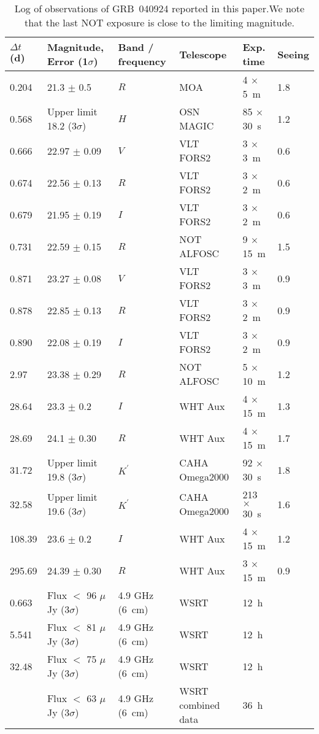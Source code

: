 \begin{table}%
\par
\caption{Log of observations of GRB~040924 reported in this paper.\label{obstable} We note that the last NOT exposure is close to the limiting magnitude.}
\begin{tabular}{llllll}
\hline\hline
 $\Delta t$ (d) & Magnitude, Error (1$\sigma$) & Band / frequency & Telescope & Exp. time & Seeing\\
\hline
0.204 & 21.3 $\pm$ 0.5 & $R$ & MOA & 4 $\times$ 5~m & 1.8\\
0.568 & Upper limit 18.2 (3$\sigma$) & $H$ & OSN MAGIC & 85 $\times$ 30~s &1.2\\
0.666 &  22.97 $\pm$ 0.09 & $V$ & VLT FORS2  & 3 $\times$ 3~m& 0.6\\
0.674 & 22.56 $\pm$ 0.13 & $R$ & VLT FORS2  & 3 $\times$ 2~m &0.6\\
0.679 & 21.95 $\pm$ 0.19 & $I$ & VLT FORS2  & 3 $\times$ 2~m &0.6\\
0.731 & 22.59 $\pm$ 0.15 & $R$ & NOT ALFOSC & 9 $\times$ 15~m&1.5\\
0.871 & 23.27 $\pm$ 0.08 & $V$ & VLT FORS2 & 3 $\times$ 3~m& 0.9\\
0.878 & 22.85 $\pm$ 0.13 & $R$ & VLT FORS2& 3 $\times$ 2~m   &0.9\\
0.890 & 22.08 $\pm$ 0.19& $I$ & VLT FORS2& 3 $\times$ 2~m   & 0.9\\
2.97 & 23.38 $\pm$ 0.29  & $R$ & NOT ALFOSC & 5 $\times$ 10~m &1.2\\
28.64 & 23.3  $\pm$  0.2& $I$ & WHT Aux  & 4 $\times$ 15~m & 1.3\\
28.69 & 24.1 $\pm$ 0.30 & $R$ & WHT Aux  & 4 $\times$ 15~m & 1.7 \\
31.72 & Upper limit 19.8 (3$\sigma$) & $K^\prime$ & CAHA Omega2000  &  92 $\times$ 30~s&1.8\\
32.58 & Upper limit 19.6 (3$\sigma$) & $K^\prime$ & CAHA Omega2000 & 213 $\times$ 30~s& 1.6 \\
108.39& 23.6 $\pm$ 0.2  & $I$ & WHT Aux  & 4 $\times$ 15~m & 1.2\\
295.69 & 24.39 $\pm$ 0.30 &  $R$ & WHT Aux  & 3 $\times$ 15~m & 0.9\\ 
\hline
0.663  & Flux $<$ 96 $\mu$Jy (3$\sigma$) & 4.9 GHz (6~cm) & WSRT  & 12~h&\\
5.541 & Flux $<$ 81 $\mu$Jy (3$\sigma$)&4.9 GHz (6~cm)& WSRT  & 12~h&\\
32.48 & Flux $<$ 75 $\mu$Jy (3$\sigma$) & 4.9 GHz (6~cm) & WSRT  & 12~h&\\
      & Flux $<$ 63 $\mu$Jy (3$\sigma$) &  4.9 GHz (6~cm) & WSRT combined data & 36~h&\\ 
\hline
\end{tabular}
\end{table}